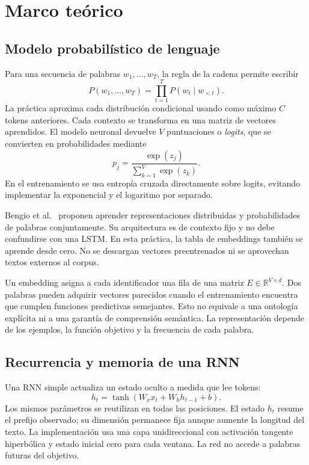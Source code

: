 \section{Marco teórico}
\subsection{Modelo probabilístico de lenguaje}
Para una secuencia de palabras $w_1,\ldots,w_T$, la regla de la cadena
permite escribir
\begin{equation}
 P(w_1,\ldots,w_T)=\prod_{t=1}^{T}P(w_t\mid w_{<t}).
\end{equation}
La práctica aproxima cada distribución condicional usando como máximo
$C$ tokens anteriores. Cada contexto se transforma en una matriz de
vectores aprendidos. El modelo neuronal devuelve $V$ puntuaciones o
\emph{logits}, que se convierten en probabilidades mediante
\begin{equation}
 p_j=\frac{\exp(z_j)}{\sum_{k=1}^{V}\exp(z_k)}.
\end{equation}
En el entrenamiento se usa entropía cruzada directamente sobre logits,
evitando implementar la exponencial y el logaritmo por separado.

Bengio et al.~\cite{bengio2003} proponen aprender representaciones
distribuidas y probabilidades de palabras conjuntamente. Su arquitectura
es de contexto fijo y no debe confundirse con una LSTM. En esta práctica,
la tabla de embeddings también se aprende desde cero. No se descargan
vectores preentrenados ni se aprovechan textos externos al corpus.

Un embedding asigna a cada identificador una fila de una matriz
$E\in\mathbb{R}^{V\times d}$. Dos palabras pueden adquirir vectores
parecidos cuando el entrenamiento encuentra que cumplen funciones
predictivas semejantes. Esto no equivale a una ontología explícita ni a
una garantía de comprensión semántica. La representación depende de los
ejemplos, la función objetivo y la frecuencia de cada palabra.

\subsection{Recurrencia y memoria de una RNN}
Una RNN simple actualiza un estado oculto a medida que lee tokens:
\begin{equation}
 h_t=\tanh(W_x x_t+W_h h_{t-1}+b).
\end{equation}
Los mismos parámetros se reutilizan en todas las posiciones. El estado
$h_t$ resume el prefijo observado; su dimensión permanece fija aunque
aumente la longitud del texto. La implementación usa una capa
unidireccional con activación tangente hiperbólica y estado inicial cero
para cada ventana. La red no accede a palabras futuras del objetivo.

